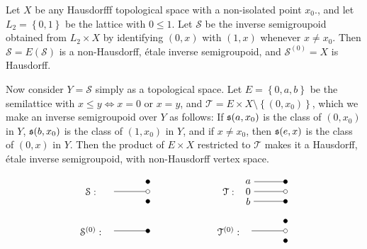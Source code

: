 \begin{example}
Let $X$ be any Hausdorfff topological space with a non-isolated point $x_0$., and let $L_2=\left\{0,1\right\}$ be the lattice with $0\leq 1$. Let $\mathcal{S}$ be the inverse semigroupoid obtained from $L_2\times X$ by identifying $(0,x)$ with $(1,x)$ whenever $x\neq x_0$. Then $\mathcal{S}=E(\mathcal{S})$ is a non-Hausdorff, étale inverse semigroupoid, and $\mathcal{S}^{(0)}=X$ is Hausdorff.

Now consider $Y=\mathcal{S}$ simply as a topological space. Let $E=\left\{0,a,b\right\}$ be the semilattice with $x\leq y\iff x=0\text{ or }x=y$, and $\mathcal{T}=E\times X\setminus\left\{(0,x_0)\right\}$, which we make an inverse semigroupoid over $Y$ as follows: If $\operatorname{\mathfrak{s}}(a,x_0)$ is the class of $(0,x_0)$ in $Y$, $\operatorname{\mathfrak{s}}(b,x_0)$ is the class of $(1,x_0)$ in $Y$, and if $x\neq x_0$, then $\operatorname{\mathfrak{s}}(e,x)$ is the class of $(0,x)$ in $Y$. Then the product of $E\times X$ restricted to $\mathcal{T}$ makes it a Hausdorff, étale inverse semigroupoid, with non-Hausdorff vertex space.

\[\begin{tikzpicture}[scale=0.7]
\node (SS0) at (0,0) {};
\draw[fill=black] ([shift={+(-0.1,0)}]SS0) circle (0.1);
\node (start_X) at ([shift={+(-2,-0.5)}]SS0) {};
\node (end_X) at ([shift={+(2,0)}]start_X) {};
\draw[-] (start_X)--(end_X);
\draw[fill=white] ([shift={+(-0.1,0)}]end_X) circle (0.1);
\node (Y1) at ([shift={+(0,-0.5)}]end_X) {};
\draw[fill=black] ([shift={+(-0.1,0)}]Y1) circle (0.1);
\node (start_S0) at ([shift={+(0,-2)}]start_X) {};
\node (end_S0) at ([shift={+(2,0)}]start_S0) {};
\draw[-] (start_S0)--(end_S0);
\draw[fill=black] ([shift={+(-0.1,0)}]end_S0) circle (0.1);

\node (S) at ([shift={+(-1,0)}]start_X) {$\mathcal{S}:$} ;
\node (S0) at ([shift={+(-1,0)}]start_S0) {$\mathcal{S}^{(0)}:$} ;

\node (start_a) at ([shift={+(5,0)}]SS0) {$a$};
\node (end_a) at ([shift={+(2,0)}]start_a)  {};
\draw[-] (start_a)--(end_a);
\draw[fill=black] ([shift={+(-0.1,0)}]end_a) circle (0.1);
\node (start_0) at ([shift={+(0,-0.5)}]start_a) {$0$} ;
\node (end_0) at ([shift={+(2,0)}]start_0)  {};
\draw[-] (start_0)--(end_0) ;
\draw[fill=white] ([shift={+(-0.1,0)}]end_0) circle (0.1);
\node (start_b) at ([shift={+(0,-0.5)}]start_0) {$b$} ;
\node (end_b) at ([shift={+(2,0)}]start_b)  {};
\draw[-] (start_b)--(end_b) ;
\draw[fill=black] ([shift={+(-0.1,0)}]end_b) circle (0.1);
\node (Y0) at ([shift={+(0,-1)}]end_b) {};
\draw[fill=black] ([shift={+(-0.1,0)}]Y0) circle (0.1);
\node (start_X) at ([shift={+(-2,-0.5)}]Y0) {};
\node (end_X) at ([shift={+(2,0)}]start_X) {};
\draw[-] (start_X)--(end_X);
\draw[fill=white] ([shift={+(-0.1,0)}]end_X) circle (0.1);
\node (Y1) at ([shift={+(0,-0.5)}]end_X) {};
\draw[fill=black] ([shift={+(-0.1,0)}]Y1) circle (0.1);

\node (T) at ([shift={+(-1,0)}]start_0) {$\mathcal{T}:$} ;
\node (T0) at ([shift={+(-1,0)}]start_X) {$\mathcal{T}^{(0)}:$} ;
\end{tikzpicture}
\]
\end{example}
